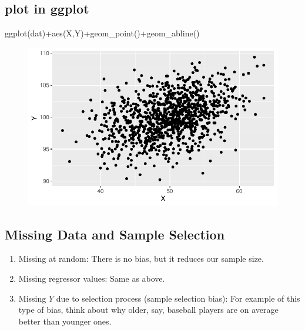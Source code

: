 \documentclass[
  letterpaper,
  DIV=11,
  numbers=noendperiod]{scrartcl}
\newenvironment{Shaded}{\begin{snugshade}}{\end{snugshade}}
\newcommand{\FunctionTok}[1]{\textcolor[rgb]{0.28,0.35,0.67}{#1}}
\newcommand{\NormalTok}[1]{\textcolor[rgb]{0.00,0.23,0.31}{#1}}
\newcommand{\SpecialCharTok}[1]{\textcolor[rgb]{0.37,0.37,0.37}{#1}}
\providecommand{\tightlist}{%
  \setlength{\itemsep}{0pt}\setlength{\parskip}{0pt}}\usepackage{longtable,booktabs,array}
\begin{document}
\hypertarget{plot-in-ggplot}{%
\subsection{plot in ggplot}\label{plot-in-ggplot}}

\begin{Shaded}
\begin{Highlighting}[]
\FunctionTok{ggplot}\NormalTok{(dat)}\SpecialCharTok{+}\FunctionTok{aes}\NormalTok{(X,Y)}\SpecialCharTok{+}\FunctionTok{geom\_point}\NormalTok{()}\SpecialCharTok{+}\FunctionTok{geom\_abline}\NormalTok{()}
\end{Highlighting}
\end{Shaded}

\begin{figure}[H]

{\centering \includegraphics{assesing_regression_files/figure-pdf/unnamed-chunk-8-1.pdf}

}

\end{figure}

\hypertarget{missing-data-and-sample-selection}{%
\subsection{Missing Data and Sample
Selection}\label{missing-data-and-sample-selection}}

\begin{enumerate}
\def\labelenumi{\arabic{enumi}.}
\tightlist
\item
  Missing at random: There is no bias, but it reduces our sample size.
\item
  Missing regressor values: Same as above.
\item
  Missing \(Y\) due to selection process (sample selection bias): For
  example of this type of bias, think about why older, say, baseball
  players are on average better than younger ones.
\end{enumerate}
\end{document}
